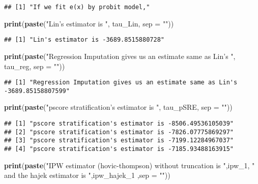 \documentclass[]{article}
\newenvironment{Shaded}{\begin{snugshade}}{\end{snugshade}}
\newcommand{\KeywordTok}[1]{\textcolor[rgb]{0.13,0.29,0.53}{\textbf{#1}}}
\newcommand{\DataTypeTok}[1]{\textcolor[rgb]{0.13,0.29,0.53}{#1}}
\newcommand{\DecValTok}[1]{\textcolor[rgb]{0.00,0.00,0.81}{#1}}
\newcommand{\StringTok}[1]{\textcolor[rgb]{0.31,0.60,0.02}{#1}}
\newcommand{\NormalTok}[1]{#1}
\begin{document}
\begin{verbatim}
## [1] "If we fit e(x) by probit model,"
\end{verbatim}

\begin{Shaded}
\begin{Highlighting}[]
\KeywordTok{print}\NormalTok{(}\KeywordTok{paste}\NormalTok{(}\StringTok{"Lin's estimator is "}\NormalTok{, tau_Lin, }\DataTypeTok{sep =} \StringTok{""}\NormalTok{))}
\end{Highlighting}
\end{Shaded}

\begin{verbatim}
## [1] "Lin's estimator is -3689.8515880728"
\end{verbatim}

\begin{Shaded}
\begin{Highlighting}[]
\KeywordTok{print}\NormalTok{(}\KeywordTok{paste}\NormalTok{(}\StringTok{"Regression Imputation gives us an estimate same as Lin's "}\NormalTok{, tau_reg, }\DataTypeTok{sep =} \StringTok{""}\NormalTok{))}
\end{Highlighting}
\end{Shaded}

\begin{verbatim}
## [1] "Regression Imputation gives us an estimate same as Lin's -3689.85158807599"
\end{verbatim}

\begin{Shaded}
\begin{Highlighting}[]
\KeywordTok{print}\NormalTok{(}\KeywordTok{paste}\NormalTok{(}\StringTok{"pscore stratification's estimator is "}\NormalTok{, tau_pSRE, }\DataTypeTok{sep =} \StringTok{""}\NormalTok{))}
\end{Highlighting}
\end{Shaded}

\begin{verbatim}
## [1] "pscore stratification's estimator is -8506.49536105039"
## [2] "pscore stratification's estimator is -7826.07775869297"
## [3] "pscore stratification's estimator is -7199.12284967037"
## [4] "pscore stratification's estimator is -7185.93488163915"
\end{verbatim}

\begin{Shaded}
\begin{Highlighting}[]
\KeywordTok{print}\NormalTok{(}\KeywordTok{paste}\NormalTok{(}\StringTok{"IPW estimator (hovic-thompson) without truncation is "}\NormalTok{,ipw_}\DecValTok{1}\NormalTok{, }\StringTok{" and the hajek estimator is "}\NormalTok{,ipw_hajek_}\DecValTok{1}\NormalTok{ ,}\DataTypeTok{sep =} \StringTok{""}\NormalTok{))}
\end{Highlighting}
\end{Shaded}
\end{document}
